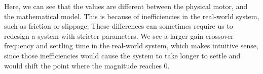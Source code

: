 \documentclass[11pt]{article}
\begin{document}
Here, we can see that the values are different between the physical motor, and the mathematical model. This is because of inefficiencies in the real-world system, such as friction or slippage. These differences can sometimes require us to redesign a system with stricter parameters. We see a larger gain crossover frequency and settling time in the real-world system, which makes intuitive sense, since those inefficiencies would cause the system to take longer to settle and would shift the point where the magnitude reaches 0.
\end{document}
